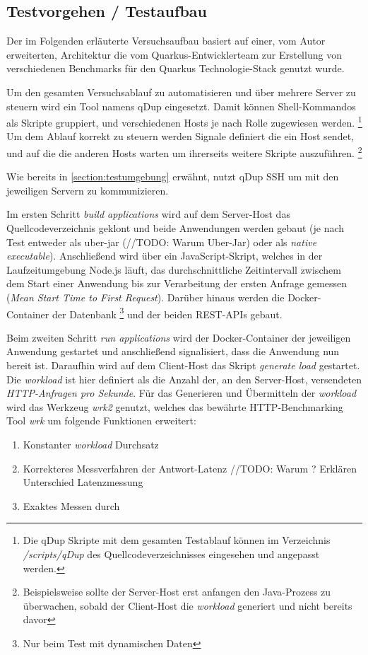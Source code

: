 \subsection{Testvorgehen / Testaufbau}
\label{section:vorgehen}
Der im Folgenden erläuterte Versuchsaufbau basiert auf einer, vom Autor erweiterten, Architektur die vom Quarkus-Entwicklerteam
zur Erstellung von verschiedenen Benchmarks für den Quarkus Technologie-Stack genutzt wurde.
\parencite{QuarkusBlog, QuarkusJohnaohara}

Um den gesamten Versuchsablauf zu automatisieren und über mehrere Server zu steuern wird ein Tool namens qDup eingesetzt.
Damit können Shell-Kommandos als Skripte gruppiert, und verschiedenen Hosts je nach Rolle zugewiesen werden.
\footnote{Die qDup Skripte mit dem gesamten Testablauf können im Verzeichnis \textit{/scripts/qDup} des Quellcodeverzeichnisses eingesehen und
	angepasst werden.}
Um dem Ablauf korrekt zu steuern werden Signale definiert die ein Host sendet, und auf die die anderen Hosts warten um ihrerseits
weitere Skripte auszuführen.
\footnote{Beispielsweise sollte der Server-Host erst anfangen den Java-Prozess zu überwachen, sobald der Client-Host die \textit{workload}
	generiert und nicht bereits davor}


Wie bereits in \ref{section:testumgebung} erwähnt, nutzt qDup SSH um mit den jeweiligen Servern zu kommunizieren.

Im ersten Schritt \textit{build applications} wird auf dem Server-Host das Quellcodeverzeichnis geklont und beide Anwendungen werden gebaut
(je nach Test entweder als uber-jar (//TODO: Warum Uber-Jar) oder als \textit{native executable}). Anschließend wird über ein JavaScript-Skript,
welches in der Laufzeitumgebung Node.js läuft, das durchschnittliche Zeitintervall zwischem dem Start einer Anwendung bis
zur Verarbeitung der ersten Anfrage gemessen
(\textit{Mean Start Time to First Request}). Darüber hinaus werden die Docker-Container der Datenbank
\footnote{Nur beim Test mit dynamischen Daten} und der beiden REST-APIs gebaut.

Beim zweiten Schritt \textit{run applications} wird der Docker-Container der jeweiligen Anwendung gestartet und anschließend signalisiert,
dass die Anwendung nun bereit ist.
Daraufhin wird auf dem Client-Host das Skript \textit{generate load} gestartet.
Die \textit{workload} ist hier definiert als die Anzahl der, an den Server-Host, versendeten \textit{HTTP-Anfragen pro Sekunde}.
Für das Generieren und Übermitteln der \textit{workload} wird das Werkzeug \textit{wrk2} genutzt, welches das
bewährte HTTP-Benchmarking Tool \textit{wrk} um folgende Funktionen erweitert:
\begin{enumerate}
	\item Konstanter \textit{workload} Durchsatz
	\item Korrekteres Messverfahren der Antwort-Latenz //TODO: Warum ? Erklären Unterschied Latenzmessung
	\item Exaktes Messen durch 
\end{enumerate}\parencite{Wrk2, Wrk}

